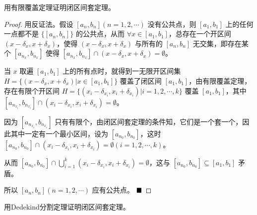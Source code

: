 \begin{problem}
    用有限覆盖定理证明闭区间套定理。
\end{problem}

\begin{proof}
    用反证法。假设 $[a_n, b_n] (n=1, 2, \cdots)$ 没有公共点，则 $[a_1, b_1]$ 上的任何一点都不是 $\{[a_n, b_n]\}$ 的公共点，从而 $\forall x \in [a_1, b_1]$，总存在一个开区间 $(x - \delta_x, x + \delta_x)$，使得 $(x - \delta_x, x + \delta_x)$ 与所有的 $[a_n, b_n]$ 无交集，即存在某个 $[a_{n_x}, b_{n_x}]$ 使得 $[a_{n_x}, b_{n_x}] \cap (x - \delta_x, x + \delta_x) = \emptyset$。
    
    当 $x$ 取遍 $[a_1, b_1]$ 上的所有点时，就得到一无限开区间集 $H = \{(x - \delta_x, x + \delta_x) | x \in [a_1, b_1]\}$ 覆盖了闭区间 $[a_1, b_1]$，由有限覆盖定理，存在有限个开区间 $H = \{(x_i - \delta_{x_i}, x_i + \delta_{x_i}) | i = 1, 2, \cdots, k\}$ 覆盖 $[a_1, b_1]$，其中 $[a_{n_{x_i}}, b_{n_{x_i}}] \cap (x_i - \delta_{x_i}, x_i + \delta_{x_i}) = \emptyset$。
    
    因为 $[a_{n_{x_i}}, b_{n_{x_i}}]$ 只有有限个，由闭区间套定理的条件知，它们是一个套一个，因此其中一定有一个最小区间，设为 $[a_{n_0}, b_{n_0}]$，这时 $[a_{n_0}, b_{n_0}] \cap (x_i - \delta_{x_i}, x_i + \delta_{x_i}) = \emptyset (i = 1, 2, \cdots, k)$。
    
    从而 $[a_{n_0}, b_{n_0}] \cap \bigcup_{i=1}^{k} (x_i - \delta_{x_i}, x_i + \delta_{x_i}) = \emptyset$，这与 $[a_{n_0}, b_{n_0}] \subseteq [a_1, b_1]$ 矛盾。
    
    所以 $[a_n, b_n] (n=1, 2, \cdots)$ 应有公共点。
    $\hfill \blacksquare$
\end{proof}

\begin{problem}
    用Dedekind分割定理证明闭区间套定理。
\end{problem}

